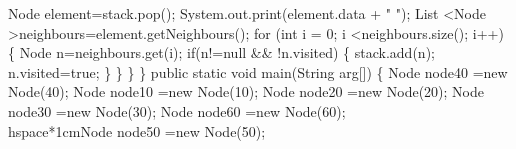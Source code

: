 \documentclass{report}
\begin{document}
			\hspace*{1cm}Node element=stack.pop();\newline
			\hspace*{1cm}System.out.print(element.data + " ");\newline
 			\hspace*{1cm}List \textless Node \textgreater neighbours=element.getNeighbours();\newline
			\hspace*{1cm}for (int i = 0; i \textless neighbours.size(); i++) \{\newline
				\hspace*{1.5cm}Node n=neighbours.get(i);\newline
				\hspace*{1.5cm}if(n!=null \&\& !n.visited)\newline
				\hspace*{1.5cm}\{\newline
					\hspace*{2cm}stack.add(n);\newline
					\hspace*{2cm}n.visited=true;\newline
 				\hspace*{1.5cm}\}\newline
			\hspace*{1cm}\}\newline
		\hspace*{0.8cm}\}\newline
	\}\newline
 	\hspace*{0.8cm}public static void main(String arg[])\newline
	\hspace*{0.8cm}\{ \newline
		\hspace*{1cm}Node node40 =new Node(40);\newline
		\hspace*{1cm}Node node10 =new Node(10);\newline
		\hspace*{1cm}Node node20 =new Node(20);\newline
		\hspace*{1cm}Node node30 =new Node(30);\newline
		\hspace*{1cm}Node node60 =new Node(60);\newline
		\\hspace*{1cm}Node node50 =new Node(50);\newline
\end{document}
